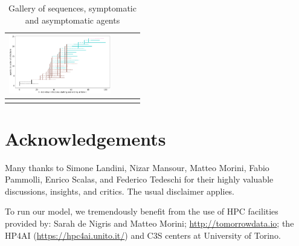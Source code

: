 \documentclass[graybox]{svmult}
\begin{document}
\begin{table}
\begin{tabular}{cccc}
 \includegraphics[width=12em]{sequences/withShort2.png} %
\\
 \hline\noalign{\smallskip}
 \end{tabular}
 \caption{Gallery of sequences, symptomatic and asymptomatic agents}
 \label{gallery}
 \end{table}


\section*{Acknowledgements}

Many thanks to Simone Landini, Nizar Mansour, Matteo Morini, Fabio Pammolli, Enrico Scalas, and Federico Tedeschi for their highly valuable discussions, insights, and critics. The usual disclaimer applies.

To run our model, we tremendously benefit from the use of HPC facilities provided by: Sarah de Nigris and Matteo Morini; \href{http://tomorrowdata.io}{http://tomorrowdata.io}; the HP4AI (\href{https://hpc4ai.unito.it/}{https://hpc4ai.unito.it/}) and C3S centers at University of Torino.




\end{document}
